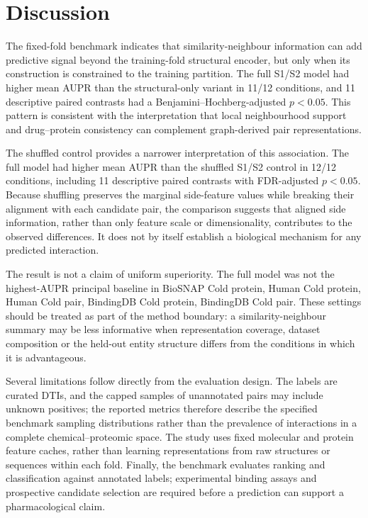 \section{Discussion}

The fixed-fold benchmark indicates that similarity-neighbour information can add predictive signal beyond the training-fold structural encoder, but only when its construction is constrained to the training partition. The full S1/S2 model had higher mean AUPR than the structural-only variant in 11/12 conditions, and 11 descriptive paired contrasts had a Benjamini--Hochberg-adjusted $p<0.05$. This pattern is consistent with the interpretation that local neighbourhood support and drug--protein consistency can complement graph-derived pair representations.

The shuffled control provides a narrower interpretation of this association. The full model had higher mean AUPR than the shuffled S1/S2 control in 12/12 conditions, including 11 descriptive paired contrasts with FDR-adjusted $p<0.05$. Because shuffling preserves the marginal side-feature values while breaking their alignment with each candidate pair, the comparison suggests that aligned side information, rather than only feature scale or dimensionality, contributes to the observed differences. It does not by itself establish a biological mechanism for any predicted interaction.

The result is not a claim of uniform superiority. The full model was not the highest-AUPR principal baseline in BioSNAP Cold protein, Human Cold protein, Human Cold pair, BindingDB Cold protein, BindingDB Cold pair. These settings should be treated as part of the method boundary: a similarity-neighbour summary may be less informative when representation coverage, dataset composition or the held-out entity structure differs from the conditions in which it is advantageous.

Several limitations follow directly from the evaluation design. The labels are curated DTIs, and the capped samples of unannotated pairs may include unknown positives; the reported metrics therefore describe the specified benchmark sampling distributions rather than the prevalence of interactions in a complete chemical--proteomic space. The study uses fixed molecular and protein feature caches, rather than learning representations from raw structures or sequences within each fold. Finally, the benchmark evaluates ranking and classification against annotated labels; experimental binding assays and prospective candidate selection are required before a prediction can support a pharmacological claim.
